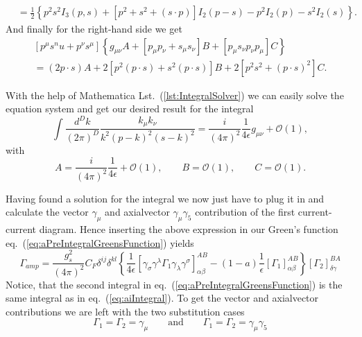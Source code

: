 \begin{enumerate}[i)]
\begin{equation}
\begin{split}
					&= \frac{1}{2}\left\{p^2s^2I_3(p,s)+[p^2+s^2+(s\cdot p)]I_2(p-s)-p^2I_2(p)-s^2I_2(s)\right\}.
				\end{split}
			\end{equation}	
			And finally for the right-hand side we get	
			\begin{equation}
				\begin{split}
					[p^\mu s^nu + p^\nu s^\mu]\left\{g_{\mu\nu}A+[p_\mu p_\nu + s_\mu s_\nu]B+[p_\mu s_\nu p_\nu p_\mu]C\right\} \\
					= (2p\cdot s)A + 2[p^2(p\cdot s)+s^2(p\cdot s)]B+2[p^2s^2+(p\cdot s)^2]C.
				\end{split}
			\end{equation}
	\end{enumerate} 
	With the help of Mathematica Lst.~(\ref{lst:IntegralSolver}) we can easily solve the equation system and get our desired result for the integral 
	\begin{equation}
		\int \frac{d^Dk}{(2\pi)^D} \frac{k_\mu k_\nu}{k^2(p-k)^2(s-k)^2} = \frac{i}{(4\pi)^2}\frac{1}{4\epsilon}g_{\mu\nu} + \mathcal{O}(1),
	\end{equation}
	with 
	\begin{equation}
		A = \frac{i}{(4\pi)^2} \frac{1}{4\epsilon} + \mathcal{O}(1), \qquad B = \mathcal{O}(1), \qquad C = \mathcal{O}(1).
	\end{equation}
	\par
	Having found a solution for the integral we now just have to plug it in and calculate the vector $\gamma_\mu$ and axialvector $\gamma_\mu \gamma_5$  contribution of the first current-current diagram. Hence inserting the above expression in our Green's function eq.~(\ref{eq:aPreIntegralGreensFunction}) yields
	\begin{equation}
		\Gamma_{amp} = \frac{g_s^2}{(4\pi)^2} C_F \delta^{ij}\delta^{kl}\left\{ \frac{1}{4\epsilon} \left[ \gamma_\sigma\gamma^\lambda\Gamma_1\gamma_\lambda\gamma^\sigma\right]^{AB}_{\alpha\beta} -(1-a) \frac{1}{\epsilon}\left[\Gamma_1\right]^{AB}_{\alpha\beta}\right\}\left[\Gamma_2\right]^{BA}_{\delta\gamma} 
	\end{equation}
	Notice, that the second integral in  eq.~(\ref{eq:aPreIntegralGreensFunction}) is the same integral as in eq.~(\ref{eq:aiIntegral}). To get the vector and axialvector contributions we are left with the two substitution cases 
	\begin{equation}
		\Gamma_1 = \Gamma_2 = \gamma_\mu \qquad \text{and} \qquad \Gamma_1 = \Gamma_2 = \gamma_\mu \gamma_5
	\end{equation}
